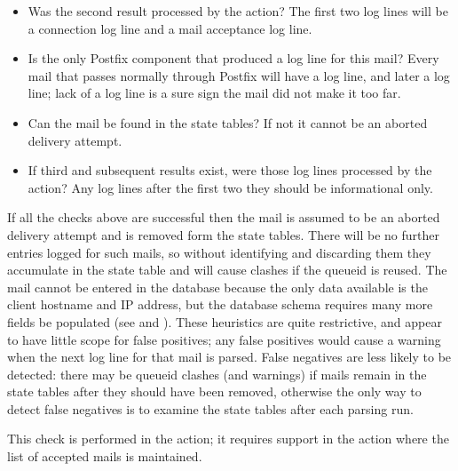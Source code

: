 \begin{itemize}

    \item Was the second result processed by the  action?
        The first two  log lines will be a connection log
        line and a mail acceptance log line.

    \item Is  the only Postfix component that produced a log
        line for this mail?  Every mail that passes normally through
        Postfix will have a  log line, and later a
         log line; lack of a  log line is a
        sure sign the mail did not make it too far.

    \item Can the mail be found in the state tables?  If not it cannot be
        an aborted delivery attempt.

    \item If third and subsequent results exist, were those log lines
        processed by the  action?  Any log lines after
        the first two they should be informational only.

\end{itemize}

If all the checks above are successful then the mail is assumed to be an
aborted delivery attempt and is removed form the state tables.  There will
be no further entries logged for such mails, so without identifying and
discarding them they accumulate in the state table and will cause clashes
if the queueid is reused.  The mail cannot be entered in the database
because the only data available is the client hostname and IP address, but
the database schema requires many more fields be populated (see
 and ).  These
heuristics are quite restrictive, and appear to have little scope for false
positives; any false positives would cause a warning when the next log line
for that mail is parsed.  False negatives are less likely to be detected:
there may be queueid clashes (and warnings) if mails remain in the state
tables after they should have been removed, otherwise the only way to
detect false negatives is to examine the state tables after each parsing
run.

This check is performed in the  action; it requires
support in the  action where the list of accepted mails is
maintained.


